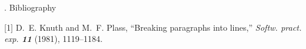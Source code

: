. Bibliography\par %
\frenchspacing %
\item{[1]} D.~E. Knuth and M.~F. Plass, ``Breaking paragraphs
into lines,'' {\sl Softw. pract. exp. \bf11} (1981), 1119--1184.
\bye %
